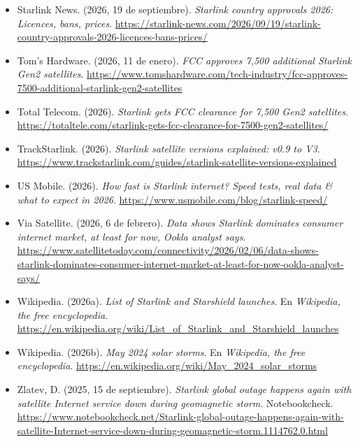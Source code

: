 \documentclass[12pt,letterpaper]{article}
\begin{document}
\begin{itemize}[leftmargin=1.5em,itemsep=7pt]
\item[] Starlink News. (2026, 19 de septiembre). \textit{Starlink country approvals 2026: Licences, bans, prices}. \url{https://starlink-news.com/2026/09/19/starlink-country-approvals-2026-licences-bans-prices/}

\item[] Tom's Hardware. (2026, 11 de enero). \textit{FCC approves 7,500 additional Starlink Gen2 satellites}. \url{https://www.tomshardware.com/tech-industry/fcc-approves-7500-additional-starlink-gen2-satellites}

\item[] Total Telecom. (2026). \textit{Starlink gets FCC clearance for 7,500 Gen2 satellites}. \url{https://totaltele.com/starlink-gets-fcc-clearance-for-7500-gen2-satellites/}

\item[] TrackStarlink. (2026). \textit{Starlink satellite versions explained: v0.9 to V3}. \url{https://www.trackstarlink.com/guides/starlink-satellite-versions-explained}

\item[] US Mobile. (2026). \textit{How fast is Starlink internet? Speed tests, real data \& what to expect in 2026}. \url{https://www.usmobile.com/blog/starlink-speed/}

\item[] Via Satellite. (2026, 6 de febrero). \textit{Data shows Starlink dominates consumer internet market, at least for now, Ookla analyst says}. \url{https://www.satellitetoday.com/connectivity/2026/02/06/data-shows-starlink-dominates-consumer-internet-market-at-least-for-now-ookla-analyst-says/}

\item[] Wikipedia. (2026a). \textit{List of Starlink and Starshield launches}. En \textit{Wikipedia, the free encyclopedia}. \url{https://en.wikipedia.org/wiki/List_of_Starlink_and_Starshield_launches}

\item[] Wikipedia. (2026b). \textit{May 2024 solar storms}. En \textit{Wikipedia, the free encyclopedia}. \url{https://en.wikipedia.org/wiki/May_2024_solar_storms}

\item[] Zlatev, D. (2025, 15 de septiembre). \textit{Starlink global outage happens again with satellite Internet service down during geomagnetic storm}. Notebookcheck. \url{https://www.notebookcheck.net/Starlink-global-outage-happens-again-with-satellite-Internet-service-down-during-geomagnetic-storm.1114762.0.html}

\end{itemize}
\end{document}
